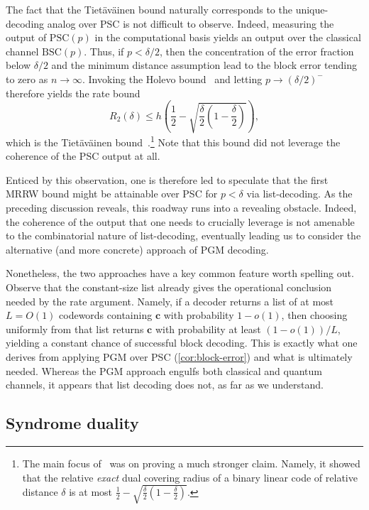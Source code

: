 \documentclass[11pt]{article}
\renewcommand{\leq}{\leqslant}
\theoremstyle{remark}
\newcommand{\bc}{\mathbf{c}}
\newcommand{\BSC}{\mathrm{BSC}}
\newcommand{\PSC}{\mathrm{PSC}}
\begin{document}
The fact that the Tiet\"av\"ainen bound naturally corresponds to the unique-decoding analog over PSC is not difficult to observe. Indeed, measuring the output of $\PSC(p)$ in the computational basis yields an output over the classical channel $\BSC(p)$. Thus, if $p < \delta/2$, then the concentration of the error fraction below $\delta/2$ and the minimum distance assumption lead to the block error tending to zero as $n \to \infty$. Invoking the Holevo bound~\cite{Hol73a} and letting $p \to (\delta/2)^-$ therefore yields the rate bound
\begin{equation*}
R_2(\delta) \leq h\left(\frac{1}{2}-\sqrt{\frac{\delta}{2}\left(1-\frac{\delta}{2}\right)}\right),
\end{equation*}
which is the Tiet\"av\"ainen bound~\cite{Tie90}.\footnote{The main focus of~\cite{Tie90} was on proving a much stronger claim. Namely, it showed that the relative \emph{exact} dual covering radius of a binary linear code of relative distance $\delta$ is at most $\frac{1}{2}-\sqrt{\frac{\delta}{2}\left(1-\frac{\delta}{2}\right)}$.} Note that this bound did not leverage the coherence of the PSC output at all.

Enticed by this observation, one is therefore led to speculate that the first MRRW bound might be attainable over PSC for $p < \delta$ via list-decoding. As the preceding discussion reveals, this roadway runs into a revealing obstacle. Indeed, the coherence of the output that one needs to crucially leverage is not amenable to the combinatorial nature of list-decoding, eventually leading us to consider the alternative (and more concrete) approach of PGM decoding.

Nonetheless, the two approaches have a key common feature worth spelling out. Observe that the constant-size list already gives the operational conclusion needed by the rate argument. Namely, if a decoder returns a list of at most $L = O(1)$ codewords containing $\bc$ with probability $1-o(1)$, then choosing uniformly from that list returns $\bc$ with probability at least $(1-o(1))/L$, yielding a constant chance of successful block decoding. This is exactly what one derives from applying PGM over PSC (\cref{cor:block-error}) and what is ultimately needed. Whereas the PGM approach engulfs both classical and quantum channels, it appears that list decoding does not, as far as we understand.

\subsection{Syndrome duality}
\label{subsec:syndrome-duality}
\end{document}
